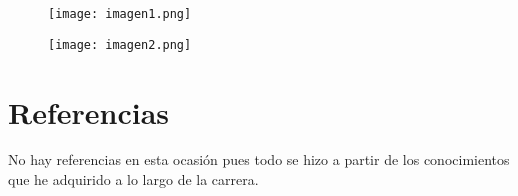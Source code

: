 \documentclass{article}
\begin{document}
    \begin{figure}[ht]
	  	\begin{center}
        \texttt{[image: imagen1.png]}		
        \end{center}	     
	\end{figure}
 
    \begin{figure}[ht]
	  	\begin{center}
        \texttt{[image: imagen2.png]}		
        \end{center}	     
	\end{figure}


   



\section*{Referencias}
No hay referencias en esta ocasión pues todo se hizo a partir de los conocimientos que he adquirido a lo largo de la carrera.
\end{document}
